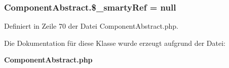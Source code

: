 \subsubsection{\setlength{\rightskip}{0pt plus 5cm}ComponentAbstract.\$\_\-smartyRef = null}\label{classComponentAbstract_98c8fb6309c207d60d3398df2b8470d9}




Definiert in Zeile 70 der Datei ComponentAbstract.php.

Die Dokumentation für diese Klasse wurde erzeugt aufgrund der Datei:\begin{CompactItemize}
\item 
{\bf ComponentAbstract.php}\end{CompactItemize}
